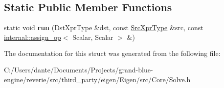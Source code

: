 \subsection*{Static Public Member Functions}
\begin{DoxyCompactItemize}
\item 
\mbox{\label{struct_eigen_1_1internal_1_1_assignment_3_01_dst_xpr_type_00_01_solve_3_01_cwise_unary_op_3_01in7a0cdfc0a6924bfcd9bc281e374a4ff8_a4bb3d1d8bcd482b994fb81569a61a0f0}} 
static void {\bfseries run} (Dst\+Xpr\+Type \&dst, const \mbox{\hyperlink{class_eigen_1_1_solve}{Src\+Xpr\+Type}} \&src, const \mbox{\hyperlink{struct_eigen_1_1internal_1_1assign__op}{internal\+::assign\+\_\+op}}$<$ Scalar, Scalar $>$ \&)
\end{DoxyCompactItemize}


The documentation for this struct was generated from the following file\+:\begin{DoxyCompactItemize}
\item 
C\+:/\+Users/dante/\+Documents/\+Projects/grand-\/blue-\/engine/reverie/src/third\+\_\+party/eigen/\+Eigen/src/\+Core/Solve.\+h\end{DoxyCompactItemize}
